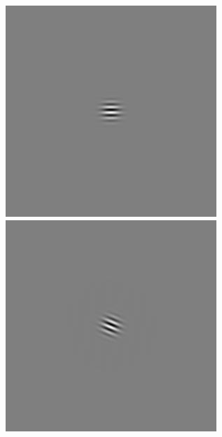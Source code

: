 \begin{figure}[ht]
\begin{center}
 \includegraphics[width=\columnwidth/9]{ch4/figures/iGabor1_4.jpg}
 \includegraphics[width=\columnwidth/9]{ch4/figures/iGabor1_5.jpg}

\end{center}
\end{figure}
